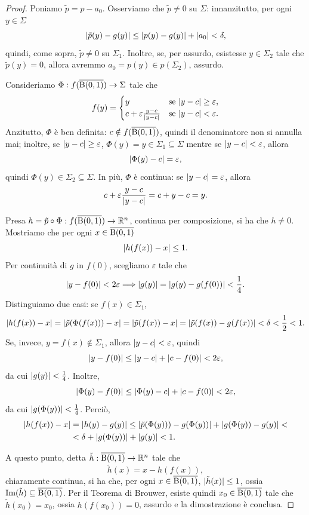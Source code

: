\begin{proof}
	Poniamo $\tilde{p} = p - a_0$. Osserviamo che $\tilde{p} \ne 0$ su $\Sigma$: innanzitutto, per ogni $y \in \Sigma$
	\[ \lvert\tilde{p}(y)-g(y)\rvert \le \lvert p(y)-g(y)\rvert + \lvert a_0\rvert < \delta, \]
	quindi, come sopra, $\tilde{p} \ne 0$ su $\Sigma_1$. Inoltre, se, per assurdo, esistesse $y \in \Sigma_2$ tale che $\tilde{p}(y) = 0$, allora avremmo $a_0 = p(y) \in p(\Sigma_2)$, assurdo.
	
	Consideriamo $\Phi: f(\overline{\textup{B}(0,1)}) \to \Sigma$ tale che
	\[ f(y) = \begin{cases}
		y & \textup{se } \lvert y-c\rvert\ge \varepsilon,\\
		c + \varepsilon \frac{y-c}{\lvert y-c\rvert} & \textup{se } \lvert y-c\rvert<\varepsilon.
	\end{cases} \]
	Anzitutto, $\Phi$ è ben definita: $c \notin f(\overline{\textup{B}(0,1)})$, quindi il denominatore non si annulla mai; inoltre, se $\lvert y-c\rvert \ge \varepsilon$, $\Phi(y) = y \in \Sigma_1 \subseteq \Sigma$ mentre se $\lvert y-c\rvert < \varepsilon$, allora 
	\[ \lvert\Phi(y)-c\rvert = \varepsilon,\]
	quindi $\Phi(y) \in \Sigma_2 \subseteq \Sigma$. In più, $\Phi$ è continua: se $\lvert y-c\rvert = \varepsilon$, allora
	\[ c + \varepsilon \frac{y-c}{\lvert y-c\rvert} = c + y - c = y. \]
	
	Presa $h = \tilde{p} \circ \Phi: f(\overline{\textup{B}(0,1)}) \to \mathbb{R}^n$, continua per composizione, si ha che $h \ne 0$. Mostriamo che per ogni $x \in \overline{\textup{B}(0,1)}$ 
	\[ \lvert h(f(x))-x\rvert\le 1. \]
	Per continuità di $g$ in $f(0)$, scegliamo $\varepsilon$ tale che
	\[ \lvert y - f(0)\rvert < 2\varepsilon \Longrightarrow \lvert g(y)\rvert = \lvert g(y)-g(f(0))\rvert <\frac{1}{4}. \]
	Distinguiamo due casi: se $f(x) \in \Sigma_1$, 
	\[ \lvert h(f(x))-x\rvert = \lvert\tilde{p}(\Phi(f(x))) -x\rvert = \lvert\tilde{p}(f(x))-x\rvert = \lvert\tilde{p}(f(x))- g(f(x))\rvert < \delta < \frac{1}{2}<1. \]
	Se, invece, $y = f(x) \notin \Sigma_1$, allora $\lvert y-c\rvert<\varepsilon$, quindi 
	\[ \lvert y - f(0)\rvert \le \lvert y-c\rvert+\lvert c-f(0)\rvert < 2\varepsilon, \] 
	da cui $\lvert g(y)\rvert<\frac{1}{4}$. Inoltre, 
	\[ \lvert\Phi(y) - f(0)\rvert \le \lvert\Phi(y)-c\rvert+\lvert c-f(0)\rvert < 2\varepsilon, \] 
	da cui $\lvert g(\Phi(y))\rvert<\frac{1}{4}$. Perciò,
	\begin{align*}
		\lvert h(f(x))-x\rvert &= \lvert h(y) -g(y)\rvert \le \lvert\tilde{p}(\Phi(y)))-g(\Phi(y))\rvert + \lvert g(\Phi(y)) - g(y)\rvert < \\
		&< \delta + \lvert g(\Phi(y)) \rvert +\lvert g(y)\rvert< 1.
	\end{align*}
	
	A questo punto, detta $\tilde{h}:\overline{\textup{B}(0,1)} \to \mathbb{R}^n$ tale che
	\[ \tilde{h}(x) = x-h(f(x)), \]
	chiaramente continua, si ha che, per ogni $x \in  \overline{\textup{B}(0,1)}$, $\lvert\tilde{h}(x)\rvert\le 1$, ossia $\textup{Im}(\tilde{h})\subseteq \overline{\textup{B}(0,1)}$. Per il Teorema di Brouwer, esiste quindi $x_0 \in \overline{\textup{B}(0,1)}$ tale che $\tilde{h}(x_0) = x_0$, ossia $h(f(x_0)) = 0$, assurdo e la dimostrazione è conclusa.
\end{proof}
